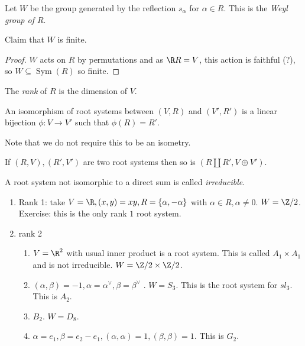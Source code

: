 \documentclass[a4paper]{article}
\begin{document}
\begin{definition}
  Let \(W\) be the group generated by the reflection \(s_\alpha\) for \(\alpha \in R\). This is the \emph{Weyl group of \(R\)}.
\end{definition}

Claim that \(W\) is finite.

\begin{proof}
  \(W\) acts on \(R\) by permutations and as \(\R R = V\), this action is faithful (?), so \(W \subseteq \operatorname{Sym}(R)\) so finite.
\end{proof}

\begin{definition}
  The \emph{rank} of \(R\) is the dimension of \(V\).
\end{definition}

\begin{definition}
  An isomorphism of root systems between \((V, R)\) and \((V', R')\) is a linear bijection \(\phi: V \to V'\) such that \(\phi(R) = R'\).
\end{definition}
Note that we do not require this to be an isometry.

\begin{ex}
  If \((R, V), (R', V')\) are two root systems then so is \((R \amalg R', V \oplus V')\).
\end{ex}

A root system not isomorphic to a direct sum is called \emph{irreducible}.

\begin{eg}\leavevmode
  \begin{enumerate}
  \item Rank 1: take \(V = \R, (x, y) = xy, R = \{\alpha, - \alpha\}\) with \(\alpha \in R, \alpha \neq 0\). \(W = \Z/2\). Exercise: this is the only rank \(1\) root system.
  \item rank 2
    \begin{enumerate}
    \item \(V = \R^2\) with usual inner product is a root system. This is called \(A_1 \times A_1\) and is not irreducible. \(W = \Z/2 \times \Z/2\).
    \item \((\alpha, \beta) = -1, \alpha = \alpha^\vee, \beta = \beta^\vee\) . \(W = S_3\). This is the root system for \(sl_3\). This is \(A_2\).
    \item \(B_2\). \(W = D_8\).
    \item \(\alpha = e_1, \beta = e_2 - e_1, (\alpha, \alpha) = 1, (\beta, \beta) = 1\). This is \(G_2\).
    \end{enumerate}
  \end{enumerate}
\end{eg}
\end{document}
